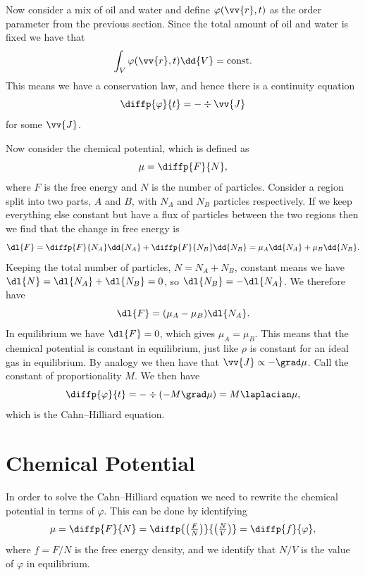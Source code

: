 \documentclass[fleqn]{NotesClass}
\begin{document}
    Now consider a mix of oil and water and define \(\varphi(\vv{r}, t)\) as the order parameter from the previous section.
    Since the total amount of oil and water is fixed we have that
    \begin{equation}
        \int_V \varphi(\vv{r}, t) \dd{V} = \text{const}.
    \end{equation}
    This means we have a conservation law, and hence there is a continuity equation
    \begin{equation}
        \diffp{\varphi}{t} = -\div\vv{J}
    \end{equation}
    for some \(\vv{J}\).
    
    Now consider the chemical potential, which is defined as
    \begin{equation}
        \mu = \diffp{F}{N},
    \end{equation}
    where \(F\) is the free energy and \(N\) is the number of particles.
    Consider a region split into two parts, \(A\) and \(B\), with \(N_A\) and \(N_B\) particles respectively.
    If we keep everything else constant but have a flux of particles between the two regions then we find that the change in free energy is
    \begin{equation}
        \dl{F} = \diffp{F}{N_A}\dd{N_A} + \diffp{F}{N_B}\dd{N_B} = \mu_A\dd{N_A} + \mu_B\dd{N_B}.
    \end{equation}
    Keeping the total number of particles, \(N = N_A + N_B\), constant means we have \(\dl{N} = \dl{N_A} + \dl{N_B} = 0\), so \(\dl{N_B} = -\dl{N_A}\).
    We therefore have
    \begin{equation}
        \dl{F} = (\mu_A - \mu_B)\dl{N_A}.
    \end{equation}
    In equilibrium we have \(\dl{F} = 0\), which gives \(\mu_A = \mu_B\).
    This means that the chemical potential is constant in equilibrium, just like \(\rho\) is constant for an ideal gas in equilibrium.
    By analogy we then have that \(\vv{J} \propto -\grad \mu\).
    Call the constant of proportionality \(M\).
    We then have
    \begin{equation}
        \diffp{\varphi}{t} = -\div(-M\grad\mu) = M\laplacian \mu,
    \end{equation}
    which is the Cahn--Hilliard equation.
    
    \section{Chemical Potential}
    In order to solve the Cahn--Hilliard equation we need to rewrite the chemical potential in terms of \(\varphi\).
    This can be done by identifying
    \begin{equation}
        \mu = \diffp{F}{N} = \diffp{\left( \tfrac{F}{N} \right)}{\left( \tfrac{N}{V} \right)} = \diffp{f}{\varphi},
    \end{equation}
    where \(f = F/N\) is the free energy density, and we identify that \(N/V\) is the value of \(\varphi\) in equilibrium.
    
\end{document}
